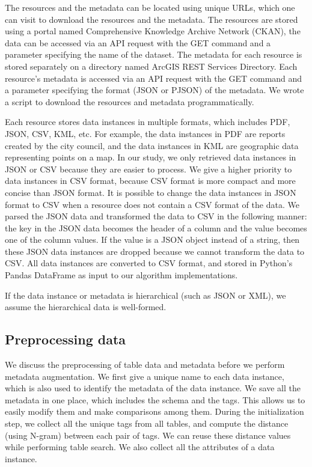 The resources and the metadata can be located using unique URLs, which one can visit to download the resources and the metadata. The resources are stored using a portal named Comprehensive Knowledge Archive Network (CKAN), the data can be accessed via an API request with the GET command and a parameter specifying the name of the dataset. The metadata for each resource is stored separately on a directory named ArcGIS REST Services Directory. Each resource's metadata is accessed via an API request with the GET command and a parameter specifying the format (JSON or PJSON) of the metadata. We wrote a script to download the resources and metadata programmatically.

Each resource stores data instances in multiple formats, which includes PDF, JSON, CSV, KML, etc. For example, the data instances in PDF are reports created by the city council, and the data instances in KML are geographic data representing points on a map. In our study, we only retrieved data instances in JSON or CSV because they are easier to process. We give a higher priority to data instances in CSV format, because CSV format is more compact and more concise than JSON format. It is possible to change the data instances in JSON format to CSV when a resource does not contain a CSV format of the data. We parsed the JSON data and transformed the data to CSV in the following manner: the key in the JSON data becomes the header of a column and the value becomes one of the column values. If the value is a JSON object instead of a string, then these JSON data instances are dropped because we cannot transform the data to CSV. All data instances are converted to CSV format, and stored in Python's Pandas DataFrame as input to our algorithm implementations.

If the data instance or metadata is hierarchical (such as JSON or XML), we assume the hierarchical data is well-formed.

\subsection{Preprocessing data}

We discuss the preprocessing of table data and metadata before we perform metadata augmentation. We first give a unique name to each data instance, which is also used to identify the metadata of the data instance. We save all the metadata in one place, which includes the schema and the tags. This allows us to easily modify them and make comparisons among them. During the initialization step, we collect all the unique tags from all tables, and compute the distance (using N-gram) between each pair of tags. We can reuse these distance values while performing table search. We also collect all the attributes of a data instance.

